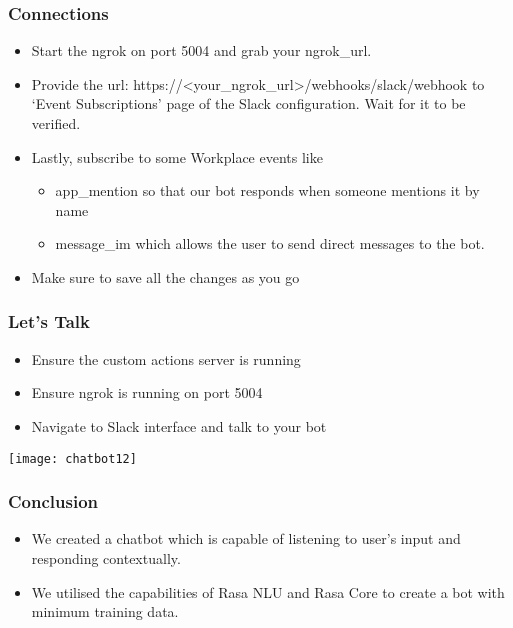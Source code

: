  \begin{frame}[fragile]\frametitle{Connections}

\begin{itemize}
\item Start the ngrok on port 5004 and grab your ngrok\_url.
\item Provide the url: https://<your\_ngrok\_url>/webhooks/slack/webhook to ‘Event Subscriptions’ page of the Slack configuration. Wait for it to be verified.
\item Lastly, subscribe to some Workplace events like
\begin{itemize}
\item app\_mention so that our bot responds when someone mentions it by name
\item message\_im which allows the user to send direct messages to the bot.
\end{itemize}
\item Make sure to save all the changes as you go
\end{itemize}

\end{frame}
 \begin{frame}[fragile]\frametitle{Let’s Talk}

\begin{itemize}
\item Ensure the custom actions server is running
\item Ensure ngrok is running on port 5004
\item Navigate to Slack interface and talk to your bot
\end{itemize}

\begin{center}
\texttt{[image: chatbot12]}
\end{center}
\end{frame}

 \begin{frame}[fragile]\frametitle{Conclusion}

\begin{itemize}
\item We created a chatbot which is capable of listening to user’s input and responding contextually.
\item We utilised the capabilities of Rasa NLU and Rasa Core to create a bot with minimum training data. 
\end{itemize}

\end{frame}